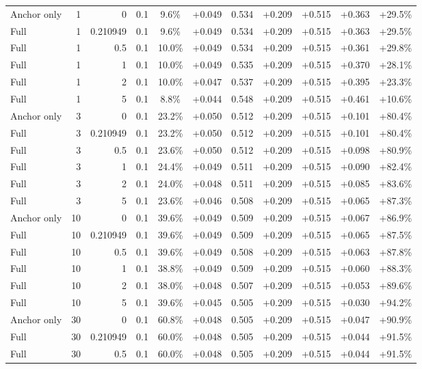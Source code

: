 \begin{table}[htbp]
\begin{tabular}{lrrrccccccc}
Anchor only & 1 & 0 & 0.1 & 9.6\% & +0.049 & 0.534 & +0.209 & +0.515 & +0.363 & +29.5\% \\
Full & 1 & 0.210949 & 0.1 & 9.6\% & +0.049 & 0.534 & +0.209 & +0.515 & +0.363 & +29.5\% \\
Full & 1 & 0.5 & 0.1 & 10.0\% & +0.049 & 0.534 & +0.209 & +0.515 & +0.361 & +29.8\% \\
Full & 1 & 1 & 0.1 & 10.0\% & +0.049 & 0.535 & +0.209 & +0.515 & +0.370 & +28.1\% \\
Full & 1 & 2 & 0.1 & 10.0\% & +0.047 & 0.537 & +0.209 & +0.515 & +0.395 & +23.3\% \\
Full & 1 & 5 & 0.1 & 8.8\% & +0.044 & 0.548 & +0.209 & +0.515 & +0.461 & +10.6\% \\
Anchor only & 3 & 0 & 0.1 & 23.2\% & +0.050 & 0.512 & +0.209 & +0.515 & +0.101 & +80.4\% \\
Full & 3 & 0.210949 & 0.1 & 23.2\% & +0.050 & 0.512 & +0.209 & +0.515 & +0.101 & +80.4\% \\
Full & 3 & 0.5 & 0.1 & 23.6\% & +0.050 & 0.512 & +0.209 & +0.515 & +0.098 & +80.9\% \\
Full & 3 & 1 & 0.1 & 24.4\% & +0.049 & 0.511 & +0.209 & +0.515 & +0.090 & +82.4\% \\
Full & 3 & 2 & 0.1 & 24.0\% & +0.048 & 0.511 & +0.209 & +0.515 & +0.085 & +83.6\% \\
Full & 3 & 5 & 0.1 & 23.6\% & +0.046 & 0.508 & +0.209 & +0.515 & +0.065 & +87.3\% \\
Anchor only & 10 & 0 & 0.1 & 39.6\% & +0.049 & 0.509 & +0.209 & +0.515 & +0.067 & +86.9\% \\
Full & 10 & 0.210949 & 0.1 & 39.6\% & +0.049 & 0.509 & +0.209 & +0.515 & +0.065 & +87.5\% \\
Full & 10 & 0.5 & 0.1 & 39.6\% & +0.049 & 0.508 & +0.209 & +0.515 & +0.063 & +87.8\% \\
Full & 10 & 1 & 0.1 & 38.8\% & +0.049 & 0.509 & +0.209 & +0.515 & +0.060 & +88.3\% \\
Full & 10 & 2 & 0.1 & 38.0\% & +0.048 & 0.507 & +0.209 & +0.515 & +0.053 & +89.6\% \\
Full & 10 & 5 & 0.1 & 39.6\% & +0.045 & 0.505 & +0.209 & +0.515 & +0.030 & +94.2\% \\
Anchor only & 30 & 0 & 0.1 & 60.8\% & +0.048 & 0.505 & +0.209 & +0.515 & +0.047 & +90.9\% \\
Full & 30 & 0.210949 & 0.1 & 60.0\% & +0.048 & 0.505 & +0.209 & +0.515 & +0.044 & +91.5\% \\
Full & 30 & 0.5 & 0.1 & 60.0\% & +0.048 & 0.505 & +0.209 & +0.515 & +0.044 & +91.5\% \\

\end{tabular}
\end{table}
